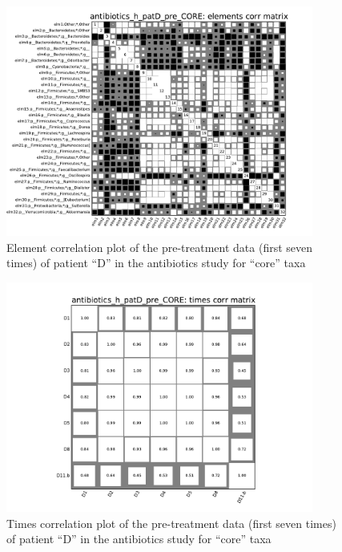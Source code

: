 \begin{figure}
	\centering
	\includegraphics[width=0.9\textwidth]{results/corrank/antibiotics_h_patD_pre_CORE_ElementsCorr}
	\caption{Element correlation plot of the pre-treatment data (first seven times) of patient ``D'' in the antibiotics study\cite{antibiotic} for ``core'' taxa}
	\label{fig:corrElm}
\end{figure}

\begin{figure}
	\centering
	\includegraphics[width=0.9\textwidth]{results/corrank/antibiotics_h_patD_pre_CORE_TimesCorr}
	\caption{Times correlation plot of the pre-treatment data (first seven times) of patient ``D'' in the antibiotics study\cite{antibiotic} for ``core'' taxa}
	\label{fig:corrTim}
\end{figure}

